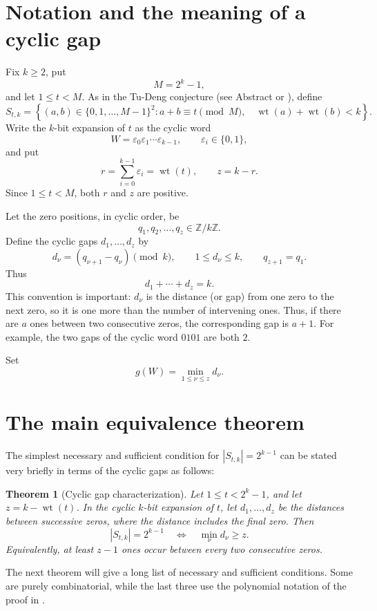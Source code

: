 \documentclass[11pt]{article}
\newtheorem{theorem}{Theorem}[section]
\newcommand{\wt}{\operatorname{wt}}
\begin{document}
\section{Notation and the meaning of a cyclic gap}

Fix $k\geq2$, put
\[
                         M=2^k-1,
\]
and let $1\leq t<M$.  As in the Tu-Deng conjecture (see Abstract or \cite[Conjecture 1.1]{Proof}), define
\[
S_{t,k}=\left\{(a,b)\in\{0,1,\ldots,M-1\}^2:
 a+b\equiv t\pmod M,\quad \wt(a)+\wt(b)<k\right\}.
\]
Write the $k$-bit expansion of $t$ as the cyclic word
\[
 W=\varepsilon _0\varepsilon _1\cdots\varepsilon _{k-1},
 \qquad \varepsilon_i\in\{0,1\},
\]
and put
\[
 r=\sum_{i=0}^{k-1}\varepsilon_i=\wt(t),
 \qquad z=k-r.
\]
Since $1\leq t<M$, both $r$ and $z$ are positive.

Let the zero positions, in cyclic order, be
\[
q_1,q_2,\ldots,q_z\in\mathbb Z/k\mathbb Z.
\]
Define the cyclic gaps $d_1,\ldots,d_z$ by
\[
 d_\nu=(q_{\nu+1}-q_\nu)\pmod k,
 \qquad 1\leq d_\nu\leq k,
 \qquad q_{z+1}=q_1.
\]
Thus
\[
                         d_1+\cdots+d_z=k.                 \tag{1}
\]
This convention is important: $d_\nu$ is the distance (or gap) from one zero to
the next zero, so it is one more than the number of intervening ones.
Thus, if there are $a$ ones between two consecutive zeros, the
corresponding gap is $a+1$.  For example, the two gaps
of the cyclic word $0101$ are both $2$.

Set
\[
                         g(W)=\min_{1\leq\nu\leq z}d_\nu.  \tag{2}
\]

\section{The main equivalence theorem}
The simplest necessary and sufficient condition for $|S_{t,k}|=2^{k-1}$  can be stated 
very briefly in terms of the cyclic gaps as follows:

\begin{theorem}[Cyclic gap characterization]
Let $1\leq t<2^k-1$, and let $z=k-\wt(t)$.  In the cyclic $k$-bit
expansion of $t$, let $d_1,\ldots,d_z$ be the distances between
successive zeros, where the distance includes the final zero.
Then
\[
                         |S_{t,k}|=2^{k-1}
 \quad\Longleftrightarrow\quad
                         \min_\nu d_\nu\geq z.               
\]
Equivalently, at least $z-1$ ones occur between every two consecutive
zeros.
\end{theorem}


The next theorem will give a long list of necessary and sufficient conditions.  Some are purely
combinatorial, while the last three use the polynomial notation of the proof in
\cite[Sections 2--5 and 8]{Proof}.
\end{document}
